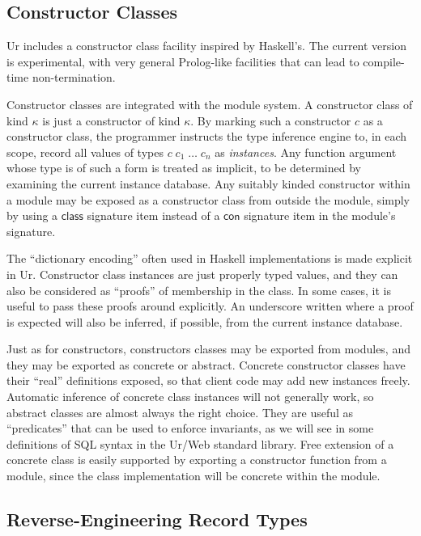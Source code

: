 \documentclass{article}
\newcommand{\mt}[1]{\mathsf{#1}}
\begin{document}
\subsection{\label{typeclasses}Constructor Classes}

Ur includes a constructor class facility inspired by Haskell's.  The current version is experimental, with very general Prolog-like facilities that can lead to compile-time non-termination.

Constructor classes are integrated with the module system.  A constructor class of kind $\kappa$ is just a constructor of kind $\kappa$.  By marking such a constructor $c$ as a constructor class, the programmer instructs the type inference engine to, in each scope, record all values of types $c \; c_1 \; \ldots \; c_n$ as \emph{instances}.  Any function argument whose type is of such a form is treated as implicit, to be determined by examining the current instance database.  Any suitably kinded constructor within a module may be exposed as a constructor class from outside the module, simply by using a $\mt{class}$ signature item instead of a $\mt{con}$ signature item in the module's signature.

The ``dictionary encoding'' often used in Haskell implementations is made explicit in Ur.  Constructor class instances are just properly typed values, and they can also be considered as ``proofs'' of membership in the class.  In some cases, it is useful to pass these proofs around explicitly.  An underscore written where a proof is expected will also be inferred, if possible, from the current instance database.

Just as for constructors, constructors classes may be exported from modules, and they may be exported as concrete or abstract.  Concrete constructor classes have their ``real'' definitions exposed, so that client code may add new instances freely.  Automatic inference of concrete class instances will not generally work, so abstract classes are almost always the right choice.  They are useful as ``predicates'' that can be used to enforce invariants, as we will see in some definitions of SQL syntax in the Ur/Web standard library.  Free extension of a concrete class is easily supported by exporting a constructor function from a module, since the class implementation will be concrete within the module.

\subsection{Reverse-Engineering Record Types}
\end{document}
